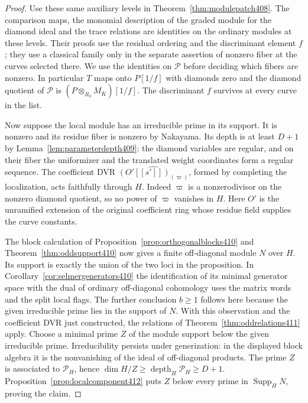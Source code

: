 \documentclass[a4paper,11pt]{article}
\theoremstyle{definition}
\theoremstyle{remark}
\numberwithin{equation}{section}
\begin{document}
\begin{proof}
Use these same auxiliary levels in
Theorem~\ref{thm:modulepatch408}. The comparison maps,
the monomial description of the graded module for the diamond
ideal and the trace relations are identities on the
ordinary modules at these levels. Their proofs use the residual
ordering and the discriminant element \(f\); they use a
classical family only in the separate assertion of nonzero
fiber at the curves selected there. We use the identities on
\(\mathcal P\) before deciding which fibers are nonzero.
In particular \(T\) maps onto \(P[1/f]\) with diamonds zero and
the diamond quotient of \(\mathcal P\) is
\((P\otimes_{R_0}M_K)[1/f]\). The discriminant \(f\) survives
at every curve in the list.

Now suppose the local module has an irreducible prime in its
support. It is nonzero and its residue fiber is nonzero by
Nakayama. Its depth is at least \(D+1\) by
Lemma~\ref{lem:parameterdepth409}: the diamond variables are
regular, and on their fiber the uniformizer and the translated
weight coordinates form a regular sequence. The coefficient
DVR \(\widehat{(O'[[s']])_{(\varpi)}}\), formed by completing
the localization, acts faithfully through \(H\). Indeed \(\varpi\)
is a nonzerodivisor on the nonzero diamond quotient, so no
power of \(\varpi\) vanishes in \(H\). Here \(O'\) is the
unramified extension of the original coefficient ring whose
residue field supplies the curve constants.

The block calculation of Proposition~\ref{prop:orthogonalblocks410}
and Theorem~\ref{thm:oddsupport410} now gives a finite off-diagonal
module \(N\) over \(H\). Its support is exactly the union of the
two loci in the proposition. In Corollary~\ref{cor:selmergenerators410}
the identification of its minimal generator space with the dual
of ordinary off-diagonal cohomology uses the matrix words and
the split local flags. The further conclusion \(b\ge1\) follows
here because the given irreducible prime lies in the support of
\(N\). With this observation and the coefficient DVR just
constructed, the relations of Theorem~\ref{thm:oddrelations411}
apply. Choose a minimal prime \(Z\) of the module support below
the given irreducible prime. Irreducibility persists under
generization: in the displayed block algebra it is the
nonvanishing of the ideal of off-diagonal products.
The prime \(Z\) is associated to \(\mathcal P_H\), hence
\(\dim H/Z\ge\operatorname{depth}_H\mathcal P_H\ge D+1\).
Proposition~\ref{prop:localcomponent412} puts \(Z\) below
every prime in \(\operatorname{Supp}_H N\), proving the claim.
\end{proof}
\end{document}
